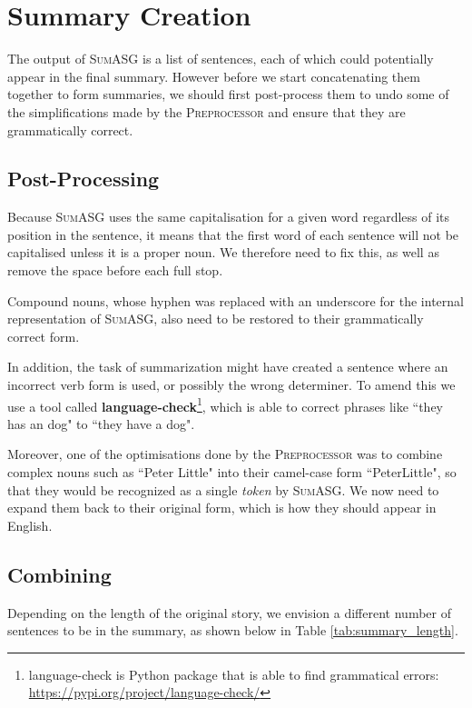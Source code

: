 \section{Summary Creation}
\label{sec:summary_creation}

The output of \textsc{SumASG} is a list of sentences, each of which could potentially appear in the final summary. However before we start concatenating them together to form summaries, we should first post-process them to undo some of the simplifications made by the \textsc{Preprocessor} and ensure that they are grammatically correct.

\subsection{Post-Processing}

Because \textsc{SumASG} uses the same capitalisation for a given word regardless of its position in the sentence, it means that the first word of each sentence will not be capitalised unless it is a proper noun. We therefore need to fix this, as well as remove the space before each full stop.

Compound nouns, whose hyphen was replaced with an underscore for the internal representation of \textsc{SumASG}, also need to be restored to their grammatically correct form.

In addition, the task of summarization might have created a sentence where an incorrect verb form is used, or possibly the wrong determiner. To amend this we use a tool called \textbf{language-check}\footnote{language-check is Python package that is able to find grammatical errors: \url{https://pypi.org/project/language-check/}}, which is able to correct phrases like ``they has an dog" to ``they have a dog".

Moreover, one of the optimisations done by the \textsc{Preprocessor} was to combine complex nouns such as ``Peter Little" into their camel-case form ``PeterLittle", so that they would be recognized as a single \textit{token} by \textsc{SumASG}. We now need to expand them back to their original form, which is how they should appear in English.

\subsection{Combining}

Depending on the length of the original story, we envision a different number of sentences to be in the summary, as shown below in Table \ref{tab:summary_length}.

